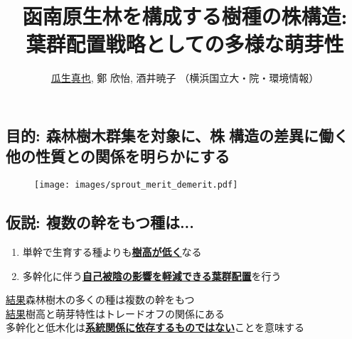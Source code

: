 \documentclass[a0, 30pt, plainboxedsections]{sciposter} %
\title{\textcolor{Blue1}{函南原生林を構成する樹種の株構造:\\\vspace{-0.2em} 葉群配置戦略としての多様な萌芽性}}
\author{\underline{瓜生真也}, 鄭 欣怡, 酒井暁子 （横浜国立大・院・環境情報） \normalsize{\faEnvelope \hspace{0.02em} \fontspec{GillSans-Italic}{suika1127@gmail.com}}}
\begin{document}
\maketitle
\vspace{-2em}
\begin{multicols}{2}
\begin{mdframed}[style=section.frame]
  \centering\huge\textbf{\color{white}{はじめに}}
\end{mdframed}

\subsection*{目的: 森林樹木群集を対象に、株構造の差異に働く\\他の性質との関係を明らかにする}

\begin{figure}
  \centering\texttt{[image: images/sprout\_merit\_demerit.pdf]}
\end{figure}

\vspace{-0.8em}
\subsection*{仮説: 複数の幹をもつ種は...}

\begin{enumerate}\setlength{\itemindent}{1em}
\item 単幹で生育する種よりも\underline{\textbf{樹高が低く}}なる
\item 多幹化に伴う\underline{\textbf{自己被陰の影響を軽減できる葉群配置}}を行う
\end{enumerate}

\columnbreak
\begin{mdframed}[style=conclusion.frame,frametitle={\huge\textbf{\color{Black1}{
  \large\textbf{\faFlagAlt \vspace{0.02em} 結論: {萌芽性は最大樹高と相反して発達し、多様な受光体制の存在が樹種の共存に貢献している}}}}}]
  \vspace{0.4em}
  \flushleft
  \normalsize{\underline{結果}森林樹木の多くの種は複数の幹をもつ\\
  \underline{結果}樹高と萌芽特性はトレードオフの関係にある\\
  }
  \large{\faHandLeft \vspace{0.02em} 多幹化と低木化は\textbf{\underline{系統関係に依存するものではない}}ことを意味する} %
  

\end{mdframed}
\end{multicols}
\end{document}
